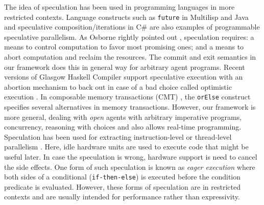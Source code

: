 The idea of speculation has been used in programming languages
in more restricted contexts. 
%
Language constructs such as {\tt future} in Multilisp 
\cite{Osborne1990:multilisp} and Java \cite{WelcJH05}
and speculative composition/iterations in C\# \cite{PrabhuRV10}
are also examples of programmable speculative parallelism.
As Osborne rightly pointed out \cite{Osborne1990:multilisp}, 
speculation requires: a means to
control computation to favor most promising ones; and a means to
abort computation and reclaim the resources. 
The commit and exit semantics in our framework does this in general way
for arbitrary agent programs.
Recent versions of Glasgow Haskell Compiler support speculative execution with 
an abortion mechanism to back out in case of a bad choice called 
optimistic execution \cite{EnnalsJ03:optimisitic}.
In composable memory transactions (CMT) \cite{Harris05:CMT}, 
the {\tt orElse} construct specifies several alternatives 
in memory transactions.
However, our framework is more general, dealing with {\em open} agents
with arbitrary imperative programs, concurrency, reasoning with choices
and also allows real-time programming.
Speculation has been used 
for extracting instruction-level or thread-level parallelism 
\cite{Hammond1998:DSS}. 
Here, idle hardware units are used to execute code that might be useful
later. In case the speculation is wrong, hardware support is need to
cancel the side effects. 
One form of such speculation is known as
{\em eager execution} \cite{Uht1995:DEE} where both sides of 
a conditional ({\tt if-then-else}) 
is executed before the condition predicate is evaluated. 
However, these forms of speculation are in restricted contexts and
are usually intended for performance rather than expressivity.

